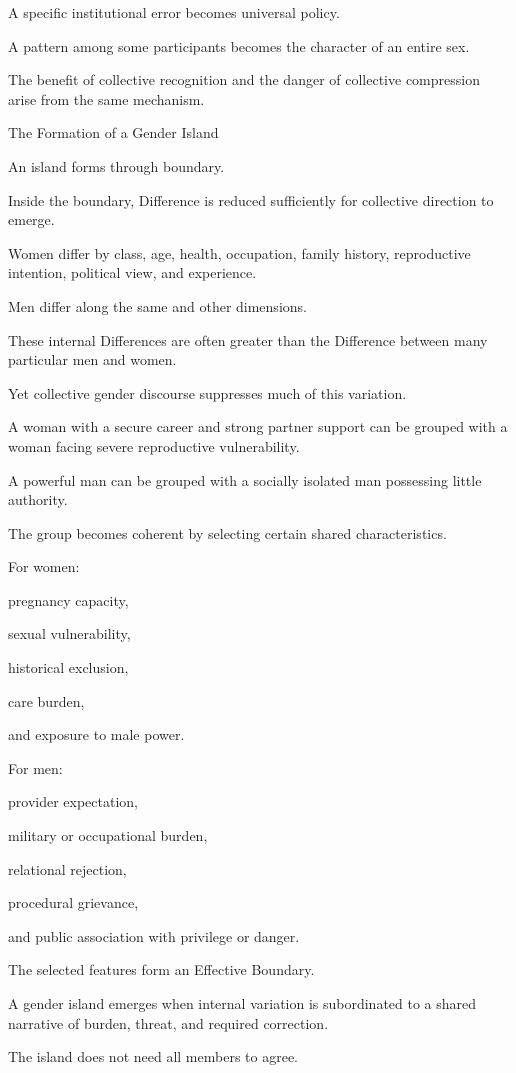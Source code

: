 A specific institutional error becomes universal policy.

A pattern among some participants becomes the character of an entire sex.

The benefit of collective recognition and the danger of collective compression arise from the same mechanism.

The Formation of a Gender Island

An island forms through boundary.

Inside the boundary, Difference is reduced sufficiently for collective direction to emerge.

Women differ by class, age, health, occupation, family history, reproductive intention, political view, and experience.

Men differ along the same and other dimensions.

These internal Differences are often greater than the Difference between many particular men and women.

Yet collective gender discourse suppresses much of this variation.

A woman with a secure career and strong partner support can be grouped with a woman facing severe reproductive vulnerability.

A powerful man can be grouped with a socially isolated man possessing little authority.

The group becomes coherent by selecting certain shared characteristics.

For women:

pregnancy capacity,

sexual vulnerability,

historical exclusion,

care burden,

and exposure to male power.

For men:

provider expectation,

military or occupational burden,

relational rejection,

procedural grievance,

and public association with privilege or danger.

The selected features form an Effective Boundary.

A gender island emerges when internal variation is subordinated to a shared narrative of burden, threat, and required correction.

The island does not need all members to agree.

